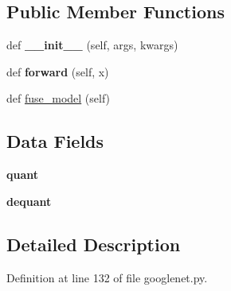 \subsection*{Public Member Functions}
\begin{DoxyCompactItemize}
\item 
\mbox{\label{classtorchvision_1_1models_1_1quantization_1_1googlenet_1_1QuantizableGoogLeNet_a90e230bd2b7c01e8b8c4c2a6d03df8ca}} 
def {\bfseries \+\_\+\+\_\+init\+\_\+\+\_\+} (self, args, kwargs)
\item 
\mbox{\label{classtorchvision_1_1models_1_1quantization_1_1googlenet_1_1QuantizableGoogLeNet_afff1b349f3610b20cbd734845810971e}} 
def {\bfseries forward} (self, x)
\item 
def \hyperlink{classtorchvision_1_1models_1_1quantization_1_1googlenet_1_1QuantizableGoogLeNet_aecb41b91188928894b629273591b103c}{fuse\+\_\+model} (self)
\end{DoxyCompactItemize}
\subsection*{Data Fields}
\begin{DoxyCompactItemize}
\item 
\mbox{\label{classtorchvision_1_1models_1_1quantization_1_1googlenet_1_1QuantizableGoogLeNet_ab740b32b8b40358777fde281530ebe70}} 
{\bfseries quant}
\item 
\mbox{\label{classtorchvision_1_1models_1_1quantization_1_1googlenet_1_1QuantizableGoogLeNet_a7eb48227cc36aebbbfec518389317492}} 
{\bfseries dequant}
\end{DoxyCompactItemize}


\subsection{Detailed Description}


Definition at line 132 of file googlenet.\+py.



